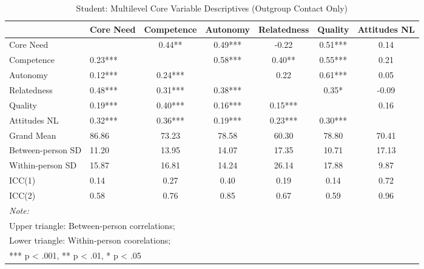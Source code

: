 \begin{table}
\begin{minipage}[t][\textheight][t]{\textwidth}

\caption{\label{tab:studentOutVarDescr}Student: Multilevel Core Variable Descriptives (Outgroup Contact Only)}
\centering
\begin{tabular}[t]{llccccc}
\toprule
  & Core Need & Competence & Autonomy & Relatedness & Quality & Attitudes NL\\
\midrule
Core Need &  & 0.44** & 0.49*** & -0.22 & 0.51*** & 0.14\\
Competence & 0.23*** &  & 0.58*** & 0.40** & 0.55*** & 0.21\\
Autonomy & 0.12*** & 0.24*** &  & 0.22 & 0.61*** & 0.05\\
Relatedness & 0.48*** & 0.31*** & 0.38*** &  & 0.35* & -0.09\\
Quality & 0.19*** & 0.40*** & 0.16*** & 0.15*** &  & 0.16\\
Attitudes NL & 0.32*** & 0.36*** & 0.19*** & 0.23*** & 0.30*** & \\
\addlinespace
Grand Mean & 86.86 & 73.23 & 78.58 & 60.30 & 78.80 & 70.41\\
Between-person SD & 11.20 & 13.95 & 14.07 & 17.35 & 10.71 & 17.13\\
Within-person SD & 15.87 & 16.81 & 14.24 & 26.14 & 17.88 & 9.87\\
ICC(1) & 0.14 & 0.27 & 0.40 & 0.19 & 0.14 & 0.72\\
ICC(2) & 0.58 & 0.76 & 0.85 & 0.67 & 0.59 & 0.96\\
\bottomrule
\multicolumn{7}{l}{\rule{0pt}{1em}\textit{Note: }}\\
\multicolumn{7}{l}{\rule{0pt}{1em}Upper triangle: Between-person correlations;}\\
\multicolumn{7}{l}{\rule{0pt}{1em}Lower triangle: Within-person coorelations;}\\
\multicolumn{7}{l}{\rule{0pt}{1em}*** p < .001, ** p < .01,  * p < .05}\\
\end{tabular}
\end{minipage}
\end{table}
